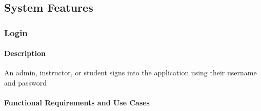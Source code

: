 \documentclass{article}
\begin{document}
\begin{itemize}
\end{itemize}

\subsection{System Features}

\subsubsection{Login}

\paragraph{Description} An admin, instructor, or student signs into the application using their username and password

\paragraph{Functional Requirements and Use Cases}
\end{document}
